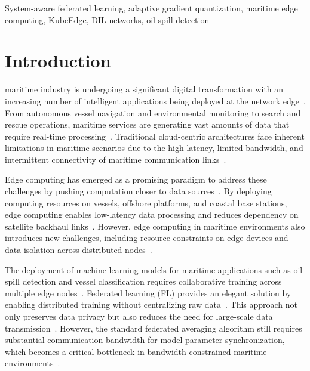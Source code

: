 \documentclass[journal]{IEEEtran}
\begin{document}
\begin{IEEEkeywords}
System-aware federated learning, adaptive gradient quantization, maritime edge computing, KubeEdge, DIL networks, oil spill detection
\end{IEEEkeywords}

\section{Introduction}
 maritime industry is undergoing a significant digital transformation with an increasing number of intelligent applications being deployed at the network edge~\cite{Marine_communication_survey}. From autonomous vessel navigation and environmental monitoring to search and rescue operations, maritime services are generating vast amounts of data that require real-time processing~\cite{tInternetUnderwaterThings2021}. Traditional cloud-centric architectures face inherent limitations in maritime scenarios due to the high latency, limited bandwidth, and intermittent connectivity of maritime communication links~\cite{wei2021hybridMaritimeIoT}.

Edge computing has emerged as a promising paradigm to address these challenges by pushing computation closer to data sources~\cite{MEC_Suervey_1}. By deploying computing resources on vessels, offshore platforms, and coastal base stations, edge computing enables low-latency data processing and reduces dependency on satellite backhaul links~\cite{yang2022kubeedge}. However, edge computing in maritime environments also introduces new challenges, including resource constraints on edge devices and data isolation across distributed nodes~\cite{yangTwoStageOffloadingOptimization2020}.

The deployment of machine learning models for maritime applications such as oil spill detection and vessel classification requires collaborative training across multiple edge nodes~\cite{Edge_inttelligence}. Federated learning (FL) provides an elegant solution by enabling distributed training without centralizing raw data~\cite{mcmahan2017fedavg}. This approach not only preserves data privacy but also reduces the need for large-scale data transmission~\cite{kairouz2021fl}. However, the standard federated averaging algorithm still requires substantial communication bandwidth for model parameter synchronization, which becomes a critical bottleneck in bandwidth-constrained maritime environments~\cite{chen2020flsurvey}.
\end{document}
